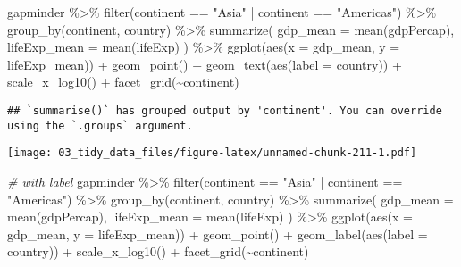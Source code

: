 \documentclass[
]{book}
\newenvironment{Shaded}{\begin{snugshade}}{\end{snugshade}}
\newcommand{\AttributeTok}[1]{\textcolor[rgb]{0.77,0.63,0.00}{#1}}
\newcommand{\CommentTok}[1]{\textcolor[rgb]{0.56,0.35,0.01}{\textit{#1}}}
\newcommand{\FunctionTok}[1]{\textcolor[rgb]{0.00,0.00,0.00}{#1}}
\newcommand{\NormalTok}[1]{#1}
\newcommand{\SpecialCharTok}[1]{\textcolor[rgb]{0.00,0.00,0.00}{#1}}
\newcommand{\StringTok}[1]{\textcolor[rgb]{0.31,0.60,0.02}{#1}}
\begin{document}
\begin{Shaded}
\begin{Highlighting}[]
\NormalTok{gapminder }\SpecialCharTok{\%\textgreater{}\%}
  \FunctionTok{filter}\NormalTok{(continent }\SpecialCharTok{==} \StringTok{"Asia"} \SpecialCharTok{|}\NormalTok{ continent }\SpecialCharTok{==} \StringTok{"Americas"}\NormalTok{) }\SpecialCharTok{\%\textgreater{}\%}
  \FunctionTok{group\_by}\NormalTok{(continent, country) }\SpecialCharTok{\%\textgreater{}\%}
  \FunctionTok{summarize}\NormalTok{(}
    \AttributeTok{gdp\_mean =} \FunctionTok{mean}\NormalTok{(gdpPercap),}
    \AttributeTok{lifeExp\_mean =} \FunctionTok{mean}\NormalTok{(lifeExp)}
\NormalTok{  ) }\SpecialCharTok{\%\textgreater{}\%}
  \FunctionTok{ggplot}\NormalTok{(}\FunctionTok{aes}\NormalTok{(}\AttributeTok{x =}\NormalTok{ gdp\_mean, }\AttributeTok{y =}\NormalTok{ lifeExp\_mean)) }\SpecialCharTok{+}
  \FunctionTok{geom\_point}\NormalTok{() }\SpecialCharTok{+}
  \FunctionTok{geom\_text}\NormalTok{(}\FunctionTok{aes}\NormalTok{(}\AttributeTok{label =}\NormalTok{ country)) }\SpecialCharTok{+}
  \FunctionTok{scale\_x\_log10}\NormalTok{() }\SpecialCharTok{+}
  \FunctionTok{facet\_grid}\NormalTok{(}\SpecialCharTok{\textasciitilde{}}\NormalTok{continent)}
\end{Highlighting}
\end{Shaded}

\begin{verbatim}
## `summarise()` has grouped output by 'continent'. You can override using the `.groups` argument.
\end{verbatim}

\texttt{[image: 03\_tidy\_data\_files/figure-latex/unnamed-chunk-211-1.pdf]}

\begin{Shaded}
\begin{Highlighting}[]
\CommentTok{\# with label}
\NormalTok{gapminder }\SpecialCharTok{\%\textgreater{}\%}
  \FunctionTok{filter}\NormalTok{(continent }\SpecialCharTok{==} \StringTok{"Asia"} \SpecialCharTok{|}\NormalTok{ continent }\SpecialCharTok{==} \StringTok{"Americas"}\NormalTok{) }\SpecialCharTok{\%\textgreater{}\%}
  \FunctionTok{group\_by}\NormalTok{(continent, country) }\SpecialCharTok{\%\textgreater{}\%}
  \FunctionTok{summarize}\NormalTok{(}
    \AttributeTok{gdp\_mean =} \FunctionTok{mean}\NormalTok{(gdpPercap),}
    \AttributeTok{lifeExp\_mean =} \FunctionTok{mean}\NormalTok{(lifeExp)}
\NormalTok{  ) }\SpecialCharTok{\%\textgreater{}\%}
  \FunctionTok{ggplot}\NormalTok{(}\FunctionTok{aes}\NormalTok{(}\AttributeTok{x =}\NormalTok{ gdp\_mean, }\AttributeTok{y =}\NormalTok{ lifeExp\_mean)) }\SpecialCharTok{+}
  \FunctionTok{geom\_point}\NormalTok{() }\SpecialCharTok{+}
  \FunctionTok{geom\_label}\NormalTok{(}\FunctionTok{aes}\NormalTok{(}\AttributeTok{label =}\NormalTok{ country)) }\SpecialCharTok{+}
  \FunctionTok{scale\_x\_log10}\NormalTok{() }\SpecialCharTok{+}
  \FunctionTok{facet\_grid}\NormalTok{(}\SpecialCharTok{\textasciitilde{}}\NormalTok{continent)}
\end{Highlighting}
\end{Shaded}
\end{document}
